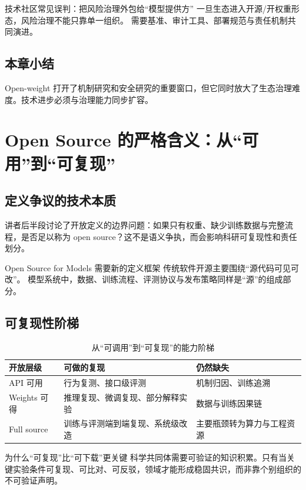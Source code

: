\documentclass[a4paper]{article}
\begin{document}
\begin{warningbox}{技术社区常见误判：把风险治理外包给“模型提供方”}
一旦生态进入开源/开权重形态，风险治理不能只靠单一组织。  
需要基准、审计工具、部署规范与责任机制共同演进。
\end{warningbox}

\subsection{本章小结}
Open-weight 打开了机制研究和安全研究的重要窗口，但它同时放大了生态治理难度。技术进步必须与治理能力同步扩容。


\section{Open Source 的严格含义：从“可用”到“可复现”}

\subsection{定义争议的技术本质}
讲者后半段讨论了开放定义的边界问题：如果只有权重、缺少训练数据与完整流程，是否足以称为 open source？这不是语义争执，而会影响科研可复现性和责任划分。

\begin{importantbox}{Open Source for Models 需要新的定义框架}
传统软件开源主要围绕“源代码可见可改”。  
模型系统中，数据、训练流程、评测协议与发布策略同样是“源”的组成部分。
\end{importantbox}

\subsection{可复现性阶梯}
\begin{table}[H]
\centering
\begin{tabular}{p{3.0cm}p{3.8cm}p{4.8cm}}
\toprule
\textbf{开放层级} & \textbf{可做的复现} & \textbf{仍然缺失} \\
\midrule
API 可用 & 行为复测、接口级评测 & 机制归因、训练追溯 \\
Weights 可得 & 推理复现、微调复现、部分解释实验 & 数据与训练因果链 \\
Full source & 训练与评测端到端复现、系统级改造 & 主要瓶颈转为算力与工程资源 \\
\bottomrule
\end{tabular}
\caption{从“可调用”到“可复现”的能力阶梯}
\end{table}

\begin{knowledgebox}{为什么“可复现”比“可下载”更关键}
科学共同体需要可验证的知识积累。只有当关键实验条件可复现、可比对、可反驳，领域才能形成稳固共识，而非靠个别组织的不可验证声明。
\end{knowledgebox}
\end{document}
